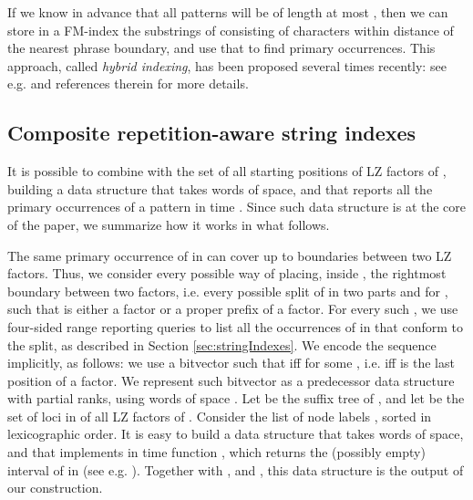 \documentclass[a4paper,UKenglish]{lipics-v2016}
\begin{document}
If we know in advance that all patterns will be of length at most , then we can store in a FM-index the substrings of  consisting of characters within distance  of the nearest phrase boundary, and use that to find primary occurrences. This approach, called \emph{hybrid indexing}, has been proposed several times recently: see e.g. \cite{valenzuela2016chico} and references therein for more details.














































\subsection{Composite repetition-aware string indexes} \label{sec:compositeStringIndexes}

It is possible to combine  with the set of all starting positions  of LZ factors of , building a data structure that takes  words of space, and that reports all the  primary occurrences of a pattern  in  time \cite{belazzougui2015composite}. Since such data structure is at the core of the paper, we summarize how it works in what follows.

The same primary occurrence of  in  can cover up to  boundaries between two LZ factors. Thus, we consider every possible way of placing, inside , the rightmost boundary between two factors, i.e. every possible split of  in two parts  and  for , such that  is either a factor or a proper prefix of a factor. For every such , we use four-sided range reporting queries to list all the occurrences of  in  that conform to the split, as described in Section \ref{sec:stringIndexes}. We encode the sequence  implicitly, as follows: we use a bitvector  such that  iff  for some , i.e. iff  is the last position of a factor. We represent such bitvector as a predecessor data structure with partial ranks, using  words of space \cite{Wi83}. Let  be the suffix tree of , and let  be the set of loci in  of all LZ factors of . Consider the list of node labels , sorted in lexicographic order. It is easy to build a data structure that takes  words of space, and that implements in  time function , which returns the (possibly empty) interval of  in  (see e.g. \cite{belazzougui2015composite}). Together with ,  and , this data structure is the output of our construction.
\end{document}
